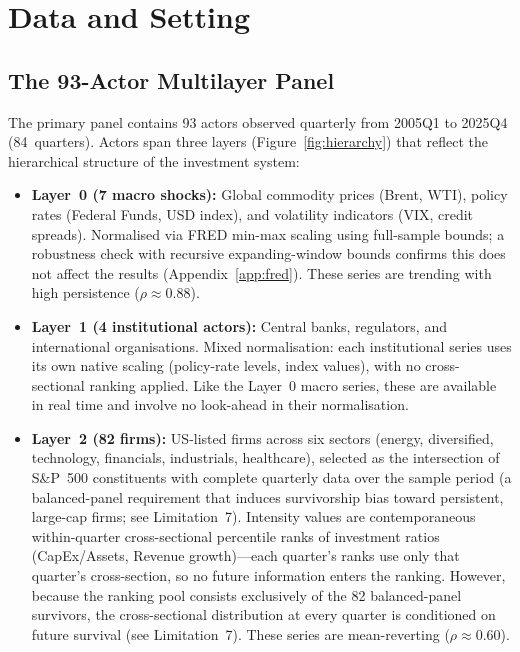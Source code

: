 \documentclass[11pt,a4paper]{article}
\begin{document}
\section{Data and Setting}
\label{sec:data}

\subsection{The 93-Actor Multilayer Panel}

The primary panel contains 93 actors observed quarterly from 2005Q1 to 2025Q4 (84~quarters). Actors span three layers (Figure~\ref{fig:hierarchy}) that reflect the hierarchical structure of the investment system:

\begin{itemize}[nosep]
  \item \textbf{Layer~0 (7 macro shocks):} Global commodity prices (Brent, WTI), policy rates (Federal Funds, USD index), and volatility indicators (VIX, credit spreads). Normalised via FRED min-max scaling using full-sample bounds; a robustness check with recursive expanding-window bounds confirms this does not affect the results (Appendix~\ref{app:fred}). These series are trending with high persistence ($\rho \approx 0.88$).
  \item \textbf{Layer~1 (4 institutional actors):} Central banks, regulators, and international organisations. Mixed normalisation: each institutional series uses its own native scaling (policy-rate levels, index values), with no cross-sectional ranking applied. Like the Layer~0 macro series, these are available in real time and involve no look-ahead in their normalisation.
  \item \textbf{Layer~2 (82 firms):} US-listed firms across six sectors (energy, diversified, technology, financials, industrials, healthcare), selected as the intersection of S\&P~500 constituents with complete quarterly data over the sample period (a balanced-panel requirement that induces survivorship bias toward persistent, large-cap firms; see Limitation~7). Intensity values are contemporaneous within-quarter cross-sectional percentile ranks of investment ratios (CapEx/Assets, Revenue growth)---each quarter's ranks use only that quarter's cross-section, so no future information enters the ranking. However, because the ranking pool consists exclusively of the 82 balanced-panel survivors, the cross-sectional distribution at every quarter is conditioned on future survival (see Limitation~7). These series are mean-reverting ($\rho \approx 0.60$).
\end{itemize}
\end{document}
